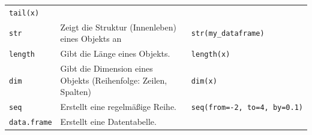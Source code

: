 \documentclass[]{book}
\begin{document}
\begin{longtable}[]{@{}lll@{}}
\begin{minipage}[t]{0.33\columnwidth}
\texttt{tail(x)}\strut
\end{minipage}\tabularnewline
\begin{minipage}[t]{0.30\columnwidth}\raggedright
\texttt{str}\strut
\end{minipage} & \begin{minipage}[t]{0.28\columnwidth}\raggedright
Zeigt die Struktur (Innenleben) eines Objekts an\strut
\end{minipage} & \begin{minipage}[t]{0.33\columnwidth}\raggedright
\texttt{str(my\_dataframe)}\strut
\end{minipage}\tabularnewline
\begin{minipage}[t]{0.30\columnwidth}\raggedright
\texttt{length}\strut
\end{minipage} & \begin{minipage}[t]{0.28\columnwidth}\raggedright
Gibt die Länge eines Objekts.\strut
\end{minipage} & \begin{minipage}[t]{0.33\columnwidth}\raggedright
\texttt{length(x)}\strut
\end{minipage}\tabularnewline
\begin{minipage}[t]{0.30\columnwidth}\raggedright
\texttt{dim}\strut
\end{minipage} & \begin{minipage}[t]{0.28\columnwidth}\raggedright
Gibt die Dimension eines Objekts (Reihenfolge: Zeilen, Spalten)\strut
\end{minipage} & \begin{minipage}[t]{0.33\columnwidth}\raggedright
\texttt{dim(x)}\strut
\end{minipage}\tabularnewline
\begin{minipage}[t]{0.30\columnwidth}\raggedright
\texttt{seq}\strut
\end{minipage} & \begin{minipage}[t]{0.28\columnwidth}\raggedright
Erstellt eine regelmäßige Reihe.\strut
\end{minipage} & \begin{minipage}[t]{0.33\columnwidth}\raggedright
\texttt{seq(from=-2,\ to=4,\ by=0.1)}\strut
\end{minipage}\tabularnewline
\begin{minipage}[t]{0.30\columnwidth}\raggedright
\texttt{data.frame}\strut
\end{minipage} & \begin{minipage}[t]{0.28\columnwidth}\raggedright
Erstellt eine Datentabelle.\strut

\end{minipage}
\end{longtable}
\end{document}
